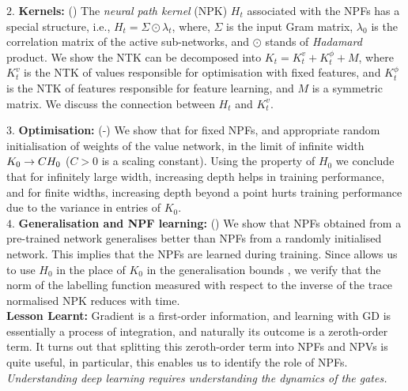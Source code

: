 $2.$ \textbf{Kernels:} () The \emph{neural path kernel} (NPK) $H_t$ associated with the NPFs has a special structure, i.e., $H_t=\Sigma\odot\lambda_t$, where, $\Sigma$ is the input Gram matrix, $\lambda_0$ is the correlation matrix of the active sub-networks, and $\odot$ stands of \emph{Hadamard} product.  We show the NTK can be decomposed into $K_t=K^v_t+K^{\phi}_t+M$, where $K^v_t$ is the NTK of values responsible for optimisation with fixed features, and $K^{\phi}_t$ is the NTK of features responsible for feature learning, and $M$ is a symmetric matrix. We discuss the connection between $H_t$ and $K^v_t$.\\
\begin{comment}$3.$ \textbf{Deep Gated Networks:} (\Cref{sec:optimisation}) We introduce the deep gated networks (DGN) framework, wherein, the gating values and hence the NPFs are held in a gating network and the NPVs are held in a value network (which is different from the gating network). The DGN framework enables us to study optimisation and generalisation properties of NPFs.\\
\end{comment}
$3.$ \textbf{Optimisation:} (-) We show that for fixed NPFs, and appropriate random initialisation of weights of the value network, in the limit of infinite width $K_0\rightarrow CH_0$ ($C>0$ is a scaling constant). Using the property of $H_0$ we conclude that for infinitely large width, increasing depth helps in training performance, and for finite widths, increasing depth beyond a point hurts training performance due to the variance in entries of $K_0$.\\
$4.$ \textbf{Generalisation and NPF learning:} () We show that NPFs obtained from a pre-trained network generalises better than NPFs from a randomly initialised network. This implies that the NPFs are learned during training. Since  allows us to use $H_0$ in the place of $K_0$ in the generalisation bounds \cite{cao2019generalization}, we verify that the norm of the labelling function measured with respect to the inverse of the trace normalised NPK reduces with time.\\
\textbf{Lesson Learnt:} Gradient is a first-order information, and learning with GD is essentially a process of integration, and naturally its outcome is a zeroth-order term. It turns out that splitting this zeroth-order term into NPFs and NPVs is quite useful, in particular, this enables us to identify the role of NPFs. \emph{Understanding deep learning requires understanding the dynamics of the gates.}
